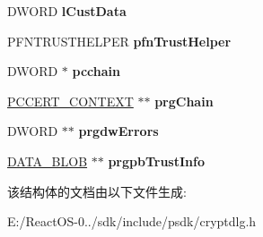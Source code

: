 \begin{DoxyCompactItemize}
D\+W\+O\+RD {\bfseries l\+Cust\+Data}
\item 
\mbox{\label{struct___c_e_r_t___v_e_r_i_f_y___c_e_r_t_i_f_i_c_a_t_e___t_r_u_s_t_a7ad8d629a3796d7d13e693d6bf877bcd}} 
P\+F\+N\+T\+R\+U\+S\+T\+H\+E\+L\+P\+ER {\bfseries pfn\+Trust\+Helper}
\item 
\mbox{\label{struct___c_e_r_t___v_e_r_i_f_y___c_e_r_t_i_f_i_c_a_t_e___t_r_u_s_t_a547b9549e5c7155f9fef9aed66e1f0de}} 
D\+W\+O\+RD $\ast$ {\bfseries pcchain}
\item 
\mbox{\label{struct___c_e_r_t___v_e_r_i_f_y___c_e_r_t_i_f_i_c_a_t_e___t_r_u_s_t_afd3c73e1f90e6c09d69de1ac2ebb9235}} 
\hyperlink{struct___c_e_r_t___c_o_n_t_e_x_t}{P\+C\+C\+E\+R\+T\+\_\+\+C\+O\+N\+T\+E\+XT} $\ast$$\ast$ {\bfseries prg\+Chain}
\item 
\mbox{\label{struct___c_e_r_t___v_e_r_i_f_y___c_e_r_t_i_f_i_c_a_t_e___t_r_u_s_t_a8ffe70eaa61677a9fa17e0251aae007a}} 
D\+W\+O\+RD $\ast$$\ast$ {\bfseries prgdw\+Errors}
\item 
\mbox{\label{struct___c_e_r_t___v_e_r_i_f_y___c_e_r_t_i_f_i_c_a_t_e___t_r_u_s_t_a7164d0a7ad283d1f7aba89dbfed5c9ad}} 
\hyperlink{struct___c_r_y_p_t_o_a_p_i___b_l_o_b}{D\+A\+T\+A\+\_\+\+B\+L\+OB} $\ast$$\ast$ {\bfseries prgpb\+Trust\+Info}
\end{DoxyCompactItemize}


该结构体的文档由以下文件生成\+:\begin{DoxyCompactItemize}
\item 
E\+:/\+React\+O\+S-\/0../sdk/include/psdk/cryptdlg.\+h\end{DoxyCompactItemize}
